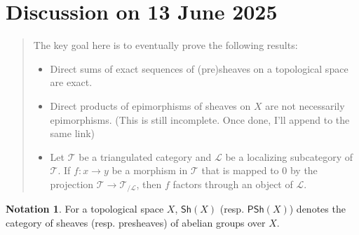 \documentclass[oneside,11pt]{amsart}
\theoremstyle{definition}
\newtheorem{notn}[thm]{Notation}
\theoremstyle{remark}
\begin{document}
\section*{Discussion on 13 June 2025} 
\begin{quotation}
 The key goal here is to eventually prove the following results:
 \begin{itemize}
  \item Direct sums of exact sequences of (pre)sheaves on a topological space are exact.
 \item Direct products of epimorphisms of sheaves on $X$ are not necessarily epimorphisms. (This is still incomplete. Once done, I'll append to the same link)
 \item Let $\mathscr{T} $ be a triangulated category and $\mathscr{L} $ be a localizing subcategory of $\mathscr{T} $. If $f:x\rightarrow y$ be a morphism in $\mathscr{T} $ that is mapped to $0$ by the projection $\mathscr{T} \rightarrow \mathscr{T}_{/\mathscr{L}}   $, then $f$ factors through an object of $\mathscr{L} $.  
 \end{itemize}
\end{quotation}
\begin{notn}
For a topological space $X$, $\textsf{Sh}(X)$ (resp. $\textsf{PSh}(X)$) denotes the category of sheaves (resp. presheaves) of abelian groups over $X$.      
\end{notn}
\end{document}
